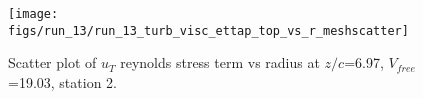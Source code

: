 \begin{figure}[H]
\centering
\texttt{[image: figs/run\_13/run\_13\_turb\_visc\_ettap\_top\_vs\_r\_meshscatter]}
\caption{Scatter plot of $
u_T$ reynolds stress term vs radius at $z/c$=6.97, $V_{free}$=19.03, station 2.}
\label{fig:run_13_turb_visc_ettap_top_vs_r_meshscatter}
\end{figure}


